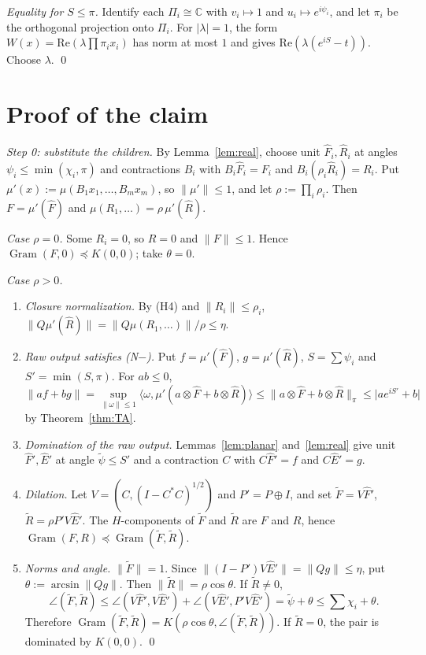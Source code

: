 \documentclass[11pt]{amsart}
\theoremstyle{definition}
\newcommand{\Gram}{\operatorname{Gram}}
\newcommand{\norm}[1]{\lVert #1\rVert}
\newcommand{\abs}[1]{\lvert #1\rvert}
\newcommand{\ip}[2]{\langle #1,#2\rangle}
\begin{document}
\emph{Equality for $S\le\pi$.} Identify each $\Pi_i\cong\mathbb C$ with $v_i\mapsto1$
and $u_i\mapsto e^{i\psi_i}$, and let $\pi_i$ be the orthogonal projection onto $\Pi_i$.
For $\abs\lambda=1$, the form $W(x)=\mathrm{Re}(\lambda\prod\pi_ix_i)$ has norm at most $1$
and gives $\mathrm{Re}(\lambda(e^{iS}-t))$. Choose $\lambda$. \qed

\section{Proof of the claim}\label{sec:proof}

\emph{Step 0: substitute the children.} By Lemma~\ref{lem:real}, choose unit
$\hat F_i,\hat R_i$ at angles $\psi_i\le\min(\chi_i,\pi)$ and contractions $B_i$ with
$B_i\hat F_i=F_i$ and $B_i(\rho_i\hat R_i)=R_i$. Put $\mu'(x):=\mu(B_1x_1,\dots,B_mx_m)$,
so $\norm{\mu'}\le1$, and let $\rho:=\prod_i\rho_i$. Then $F=\mu'(\hat F)$ and
$\mu(R_1,\dots)=\rho\,\mu'(\hat R)$.

\emph{Case $\rho=0$.} Some $R_i=0$, so $R=0$ and $\norm F\le1$. Hence
$\Gram(F,0)\preceq K(0,0)$; take $\theta=0$.

\emph{Case $\rho>0$.}
\begin{enumerate}[label=\textup{(\roman*)}]
\item \emph{Closure normalization.} By (H4) and $\norm{R_i}\le\rho_i$,
  $\norm{Q\mu'(\hat R)}=\norm{Q\mu(R_1,\dots)}/\rho\le\eta$.
\item \emph{Raw output satisfies (N$-$).} Put $f=\mu'(\hat F)$, $g=\mu'(\hat R)$,
  $S=\sum\psi_i$ and $S'=\min(S,\pi)$. For $ab\le0$,
  \[
  \norm{af+bg}=\sup_{\norm\omega\le1}\ip\omega{\mu'(a\otimes\hat F+b\otimes\hat R)}\le\norm{a\otimes\hat F+b\otimes\hat R}_\pi\le\abs{ae^{iS'}+b}
  \]
  by Theorem~\ref{thm:TA}.
\item \emph{Domination of the raw output.} Lemmas~\ref{lem:planar} and~\ref{lem:real}
  give unit $\hat F',\hat E'$ at angle $\tilde\psi\le S'$ and a contraction $C$ with
  $C\hat F'=f$ and $C\hat E'=g$.
\item \emph{Dilation.} Let $V=(C,(I-C^*C)^{1/2})$ and $P'=P\oplus I$, and set
  $\tilde F=V\hat F'$, $\tilde R=\rho P'V\hat E'$. The $H$-components of $\tilde F$ and
  $\tilde R$ are $F$ and $R$, hence $\Gram(F,R)\preceq\Gram(\tilde F,\tilde R)$.
\item \emph{Norms and angle.} $\norm{\tilde F}=1$. Since
  $\norm{(I-P')V\hat E'}=\norm{Qg}\le\eta$, put $\theta:=\arcsin\norm{Qg}$. Then
  $\norm{\tilde R}=\rho\cos\theta$. If $\tilde R\ne0$,
  \[
  \angle(\tilde F,\tilde R)\le\angle(V\hat F',V\hat E')+\angle(V\hat E',P'V\hat E')=\tilde\psi+\theta\le\textstyle\sum\chi_i+\theta .
  \]
  Therefore $\Gram(\tilde F,\tilde R)=K(\rho\cos\theta,\angle(\tilde F,\tilde R))$. If
  $\tilde R=0$, the pair is dominated by $K(0,0)$. \qed
\end{enumerate}
\end{document}
